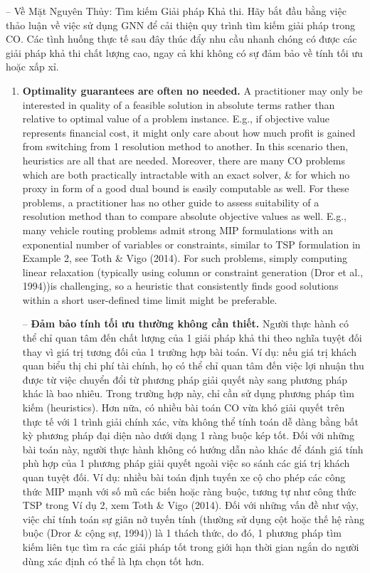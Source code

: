 \documentclass{article}
\begin{document}
\begin{itemize}
\begin{itemize}
        -- {\sf Về Mặt Nguyên Thủy: Tìm kiếm Giải pháp Khả thi.} Hãy bắt đầu bằng việc thảo luận về việc sử dụng GNN để cải thiện quy trình tìm kiếm giải pháp trong CO. Các tình huống thực tế sau đây thúc đẩy nhu cầu nhanh chóng có được các giải pháp khả thi chất lượng cao, ngay cả khi không có sự đảm bảo về tính tối ưu hoặc xấp xỉ.
        \begin{enumerate}
            \item {\bf Optimality guarantees are often no needed.} A practitioner may only be interested in quality of a feasible solution in absolute terms rather than relative to optimal value of a problem instance. E.g., if objective value represents financial cost, it might only care about how much profit is gained from switching from 1 resolution method to another. In this scenario then, heuristics are all that are needed. Moreover, there are many CO problems which are both practically intractable with an exact solver, \& for which no proxy in form of a good dual bound is easily computable as well. For these problems, a practitioner has no other guide to assess suitability of a resolution method than to compare absolute objective values as well. E.g., many vehicle routing problems admit strong MIP formulations with an exponential number of variables or constraints, similar to TSP formulation in Example 2, see Toth \& Vigo (2014). For such problems, simply computing linear relaxation (typically using column or constraint generation (Dror  et al., 1994))is challenging, so a heuristic that consistently finds good solutions within a short user-defined time limit might be preferable.

            -- {\bf Đảm bảo tính tối ưu thường không cần thiết.} Người thực hành có thể chỉ quan tâm đến chất lượng của 1 giải pháp khả thi theo nghĩa tuyệt đối thay vì giá trị tương đối của 1 trường hợp bài toán. Ví dụ: nếu giá trị khách quan biểu thị chi phí tài chính, họ có thể chỉ quan tâm đến việc lợi nhuận thu được từ việc chuyển đổi từ phương pháp giải quyết này sang phương pháp khác là bao nhiêu. Trong trường hợp này, chỉ cần sử dụng phương pháp tìm kiếm (heuristics). Hơn nữa, có nhiều bài toán CO vừa khó giải quyết trên thực tế với 1 trình giải chính xác, vừa không thể tính toán dễ dàng bằng bất kỳ phương pháp đại diện nào dưới dạng 1 ràng buộc kép tốt. Đối với những bài toán này, người thực hành không có hướng dẫn nào khác để đánh giá tính phù hợp của 1 phương pháp giải quyết ngoài việc so sánh các giá trị khách quan tuyệt đối. Ví dụ: nhiều bài toán định tuyến xe cộ cho phép các công thức MIP mạnh với số mũ các biến hoặc ràng buộc, tương tự như công thức TSP trong Ví dụ 2, xem Toth \& Vigo (2014). Đối với những vấn đề như vậy, việc chỉ tính toán sự giãn nở tuyến tính (thường sử dụng cột hoặc thế hệ ràng buộc (Dror \& cộng sự, 1994)) là 1 thách thức, do đó, 1 phương pháp tìm kiếm liên tục tìm ra các giải pháp tốt trong giới hạn thời gian ngắn do người dùng xác định có thể là lựa chọn tốt hơn.
        \end{enumerate}
    \end{itemize}
\end{itemize}
\end{document}
